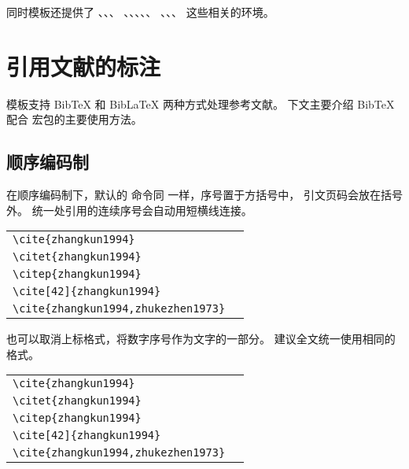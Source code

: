 同时模板还提供了 、、、
、、、、、
、、、 这些相关的环境。


\chapter{引用文献的标注}

模板支持 BibTeX 和 BibLaTeX 两种方式处理参考文献。
下文主要介绍 BibTeX 配合  宏包的主要使用方法。


\section{顺序编码制}

在顺序编码制下，默认的  命令同  一样，序号置于方括号中，
引文页码会放在括号外。
统一处引用的连续序号会自动用短横线连接。

\begin{tabular}{l@{\quad$\Rightarrow$\quad}l}
  \verb|\cite{zhangkun1994}|               & \cite{zhangkun1994}               \\
  \verb|\citet{zhangkun1994}|              & \citet{zhangkun1994}              \\
  \verb|\citep{zhangkun1994}|              & \citep{zhangkun1994}              \\
  \verb|\cite[42]{zhangkun1994}|           & \cite[42]{zhangkun1994}           \\
  \verb|\cite{zhangkun1994,zhukezhen1973}| & \cite{zhangkun1994,zhukezhen1973} \\
\end{tabular}


也可以取消上标格式，将数字序号作为文字的一部分。
建议全文统一使用相同的格式。

\begin{tabular}{l@{\quad$\Rightarrow$\quad}l}
  \verb|\cite{zhangkun1994}|               & \cite{zhangkun1994}               \\
  \verb|\citet{zhangkun1994}|              & \citet{zhangkun1994}              \\
  \verb|\citep{zhangkun1994}|              & \citep{zhangkun1994}              \\
  \verb|\cite[42]{zhangkun1994}|           & \cite[42]{zhangkun1994}           \\
  \verb|\cite{zhangkun1994,zhukezhen1973}| & \cite{zhangkun1994,zhukezhen1973} \\
\end{tabular}



